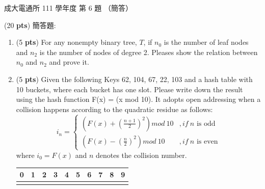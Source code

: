 \begin{pastexam}[label={px:ncku-111-cce-ds-06}]{成大電通所 111 學年度 第 6 題}
（簡答）

(20 \textbf{pts}) 簡答題:
\begin{enumerate}[label=\alph*.]
\item (5 \textbf{pts}) For any nonempty binary tree, $T$, if $n_0$ is the number of leaf nodes and
$n_2$ is the number of nodes of degree 2. Pleases show the relation between $n_0$ and $n_2$ and
prove it.
\item (5 \textbf{pts}) Given the following Keys 62, 104, 67, 22, 103 and a hash table with 10
buckets, where each bucket has one slot. Please write down the result using the hash function
F(x) = (x mod 10). It adopts open addressing when a collision happens according to the quadratic
residue as follows:
\[
i_n=\begin{cases}
\left(F(x)+\left(\frac{n+1}{2}\right)^2\right) mod\ 10 & ,if\ n \text{ is odd}\\[4pt]
\left(F(x)-\left(\frac{n}{2}\right)^2\right) mod\ 10 & ,if\ n \text{ is even}
\end{cases}
\]
where $i_0=F(x)$ and $n$ denotes the collision number.
\begin{center}
\begin{tabular}{|c|c|c|c|c|c|c|c|c|c|}
\multicolumn{1}{c}{0} & \multicolumn{1}{c}{1} & \multicolumn{1}{c}{2} & \multicolumn{1}{c}{3} &
\multicolumn{1}{c}{4} & \multicolumn{1}{c}{5} & \multicolumn{1}{c}{6} & \multicolumn{1}{c}{7} &
\multicolumn{1}{c}{8} & \multicolumn{1}{c}{9}\\ \hline
\phantom{00} & \phantom{00} & \phantom{00} & \phantom{00} & \phantom{00} & \phantom{00} &
\phantom{00} & \phantom{00} & \phantom{00} & \phantom{00}\\ \hline
\end{tabular}
\end{center}
\end{enumerate}


\end{pastexam}
